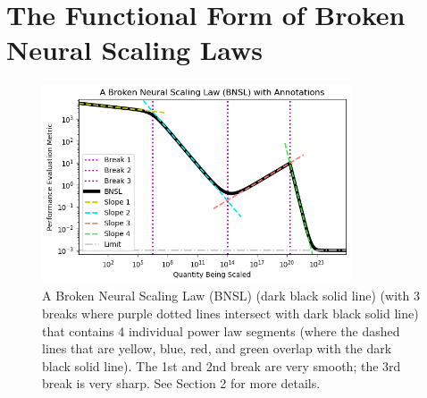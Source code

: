 \documentclass{article} %
\begin{document}
%
\vspace{-2.6mm}
\section{The Functional Form of Broken Neural Scaling Laws }
\label{section:bnsl}
\vspace{-4.7mm}

\begin{figure}[h]%
    \centering


\hspace*{-.04cm}\includegraphics[width=0.815\textwidth]{figures/figure_1/figure_1__wide.png}
\vspace{-4.7mm}

    \caption{A Broken Neural Scaling Law (BNSL) (dark black solid line) (with 3 breaks where purple dotted lines intersect with dark black solid line) that contains 4 individual power law segments (where the dashed lines that are yellow, blue, red, and green overlap with the dark black solid line). The 1st and 2nd break are very smooth; the 3rd break is very sharp. See Section 2 for more details.}
    \label{fig:figure_1}
\end{figure}
\end{document}
